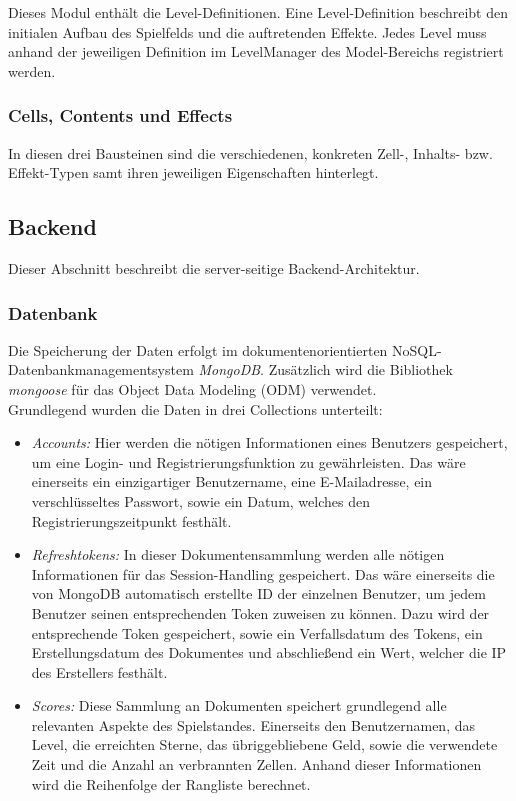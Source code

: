 \documentclass[letterpaper, 10 pt, conference]{ieeeconf}
\begin{document}
Dieses Modul enthält die Level-Definitionen.
Eine Level-Definition beschreibt den initialen Aufbau des Spielfelds und die auftretenden Effekte.
Jedes Level muss anhand der jeweiligen Definition im LevelManager des Model-Bereichs registriert werden.

\subsubsection{Cells, Contents und Effects}

In diesen drei Bausteinen sind die verschiedenen, konkreten Zell-, Inhalts- bzw. Effekt-Typen samt ihren jeweiligen Eigenschaften hinterlegt.

\subsection{Backend}
Dieser Abschnitt beschreibt die server-seitige Backend-Architektur.

\subsubsection{Datenbank}

Die Speicherung der Daten erfolgt im dokumentenorientierten NoSQL-Datenbankmanagementsystem \textit{MongoDB}.  Zusätzlich wird die Bibliothek  \textit{mongoose} für das Object Data Modeling (ODM) verwendet.  \\

Grundlegend wurden die Daten in drei Collections unterteilt:
\begin{itemize}
\item
\textit{Accounts:} Hier werden die nötigen Informationen eines Benutzers gespeichert, um
eine Login- und Registrierungsfunktion zu gewährleisten. Das wäre einerseits ein
einzigartiger Benutzername, eine E-Mailadresse, ein verschlüsseltes Passwort, sowie
ein Datum, welches den Registrierungszeitpunkt festhält.
\item
\textit{Refreshtokens:} In dieser Dokumentensammlung werden alle nötigen Informationen für
das Session-Handling gespeichert. Das wäre einerseits die von MongoDB automatisch
erstellte ID der einzelnen Benutzer, um jedem Benutzer seinen entsprechenden Token
zuweisen zu können. Dazu wird der entsprechende Token gespeichert, sowie ein Verfallsdatum
des Tokens, ein Erstellungsdatum des Dokumentes und abschließend ein Wert, welcher die
IP des Erstellers festhält.
\item
\textit{Scores:} Diese Sammlung an Dokumenten speichert grundlegend alle relevanten Aspekte des
Spielstandes. Einerseits den Benutzernamen, das Level, die erreichten Sterne, das
übriggebliebene Geld, sowie die verwendete Zeit und die Anzahl an verbrannten Zellen.
Anhand dieser Informationen wird die Reihenfolge der Rangliste berechnet.
\end{itemize}
\end{document}
